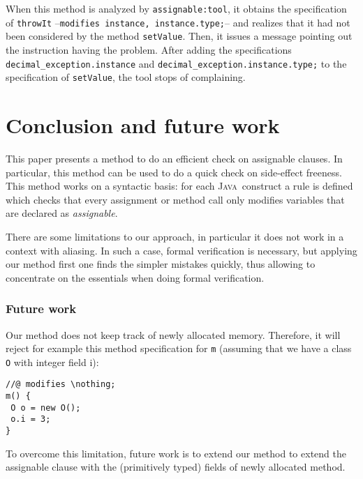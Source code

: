 \documentclass[a4paper]{llncs}
\newcommand{\java}{\textsc{Java}}
\newcommand{\modtool}{\texttt{assignable:tool}}
\newcommand{\nothing}{\texttt{\(\backslash\)nothing}}
\begin{document}
When this method is analyzed by \modtool, it obtains the specification 
of \texttt{throwIt} --\texttt{modifies instance, instance.type;}-- and 
realizes that it had not been considered by the method
\texttt{setValue}. Then, it issues a message pointing out the instruction
having the problem. After adding the specifications
\texttt{decimal\_exception.instance} and
\texttt{decimal\_exception.instance.type;} to the specification of
\texttt{setValue}, the tool stops of complaining.  


    


\section{Conclusion and future work}
\label{sec-con-and-fut-wor}
This paper presents a method to do an efficient check on assignable
clauses. In particular, this method can be used to do a quick check on 
side-effect freeness.
This method works on a syntactic basis: 
for each \java\ construct a rule is defined which checks that every
assignment or method call only modifies variables that are declared as 
\emph{assignable}. %

There are some limitations to our approach, in particular it does not
work in a context with aliasing. In such a case, formal verification
is necessary, but applying our method first one finds the simpler
mistakes quickly, thus allowing to concentrate on the essentials when
doing formal verification.


\subsubsection{Future work}
Our method does not keep track of newly allocated memory. Therefore,
it will reject for example this method specification for \texttt{m}
(assuming that we have a class \texttt{O} with integer field {i}):
\begin{verbatim}
//@ modifies \nothing;
m() {
 O o = new O();
 o.i = 3;
}
\end{verbatim}
To overcome this limitation, future work is to extend our method to extend the
assignable clause with the (primitively typed) fields of newly
allocated method.
\end{document}
